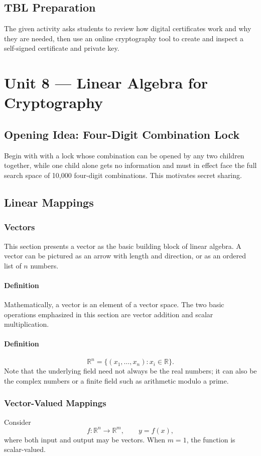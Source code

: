 \documentclass[12pt]{article}
\newcommand{\Definition}{\paragraph{Definition}}
\begin{document}
\subsection{TBL Preparation}
The given activity asks students to review how digital certificates work and why they are needed, then use an online cryptography tool to create and inspect a self-signed certificate and private key.

\newpage
\section{Unit 8 --- Linear Algebra for Cryptography}

\subsection{Opening Idea: Four-Digit Combination Lock}
Begin with with a lock whose combination can be opened by any two children together, while one child alone gets no information and must in effect face the full search space of 10,000 four-digit combinations. This motivates secret sharing.

\subsection{Linear Mappings}
\subsubsection{Vectors}
This section presents a vector as the basic building block of linear algebra. A vector can be pictured as an arrow with length and direction, or as an ordered list of $n$ numbers.

\Definition Mathematically, a vector is an element of a vector space. The two basic operations emphasized in this section are vector addition and scalar multiplication.

\Definition
\[
\mathbb R^n=\{(x_1,\ldots,x_n):x_i\in\mathbb R\}.
\]
Note that the underlying field need not always be the real numbers; it can also be the complex numbers or a finite field such as arithmetic modulo a prime.

\subsubsection{Vector-Valued Mappings}
Consider
\[
f:\mathbb R^n\rightarrow\mathbb R^m,
\qquad y=f(x),
\]
where both input and output may be vectors. When $m=1$, the function is scalar-valued.
\end{document}

